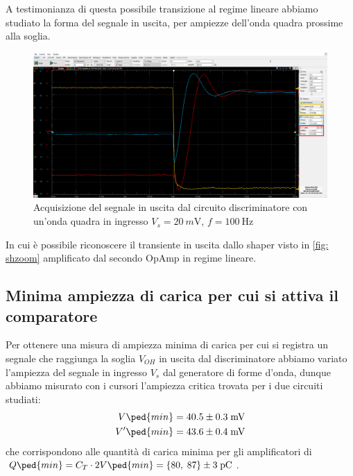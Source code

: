 \documentclass[10pt, a4paper, italian]{article}
\begin{document}
A testimonianza di questa possibile transizione al regime lineare abbiamo
studiato la forma del segnale in uscita, per ampiezze dell'onda quadra
prossime alla soglia.
\begin{figure}[htbp]
\centering
\includegraphics[scale=0.335]{shdiscthr}
\caption{Acquisizione del segnale in uscita dal circuito discriminatore con
un'onda quadra in ingresso $V_s = \SI{20}{m\V}$, $f = \SI{100}{\Hz}$
\label{fig: discrthr}}
\end{figure}
In cui è possibile riconoscere il transiente in uscita dallo shaper visto in
\ref{fig: shzoom} amplificato dal secondo OpAmp in regime lineare.

\subsection{Minima ampiezza di carica per cui si attiva il comparatore}
Per ottenere una misura di ampiezza minima di carica per cui si registra un
segnale che raggiunga la soglia $V_{OH}$ in uscita dal discriminatore abbiamo
variato l'ampiezza del segnale in ingresso $V_s$ dal generatore di forme
d'onda, dunque abbiamo misurato con i cursori l'ampiezza critica trovata per
i due circuiti studiati:
\begin{align*}
V\ped{min} &= 40.5 \pm 0.3 \; \si{m\V} \\ 
V'\ped{min} &= 43.6 \pm 0.4 \; \si{m\V}
\end{align*}
che corrispondono alle quantità di carica minima per gli amplificatori di
$Q\ped{min} = C_T \cdot 2V\ped{min} =
\{80, \; 87\} \pm  3 \; \si{\pico\coulomb}$.
\end{document}
